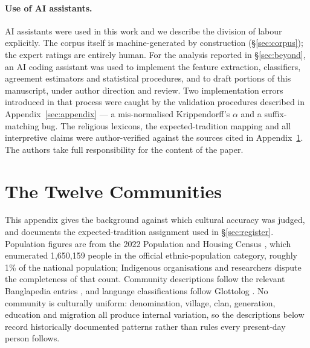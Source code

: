\documentclass[11pt]{article}
\begin{document}
\paragraph{Use of AI assistants.} AI assistants were used in this work
and we describe the division of labour explicitly. The corpus itself is
machine-generated by construction (\S\ref{sec:corpus}); the expert ratings are
entirely human. For the analysis reported in \S\ref{sec:beyond}, an AI coding
assistant was used to implement the feature extraction, classifiers, agreement
estimators and statistical procedures, and to draft portions of this
manuscript, under author direction and review. Two implementation errors
introduced in that process were caught by the validation procedures described
in Appendix~\ref{sec:appendix} --- a mis-normalised Krippendorff's $\alpha$ and
a suffix-matching bug. The
religious lexicons, the expected-tradition mapping and all interpretive claims
were author-verified against the sources cited in Appendix~\ref{sec:cultures}.
The authors take full responsibility for the content of the paper.



\appendix


\clearpage
\section{The Twelve Communities}
\label{sec:cultures}

This appendix gives the background against which cultural accuracy was judged,
and documents the expected-tradition assignment used in \S\ref{sec:register}.
Population figures are from the 2022 Population and Housing Census
\cite{bbs2022census}, which enumerated 1{,}650{,}159 people in the official
ethnic-population category, roughly 1\% of the national population; Indigenous
organisations and researchers dispute the completeness of that count.
Community descriptions follow the relevant Banglapedia entries
\cite{banglapedia}, and language classifications follow Glottolog
\cite{glottolog}. No community is culturally uniform: denomination, village,
clan, generation, education and migration all produce internal variation, so
the descriptions below record historically documented patterns rather than
rules every present-day person follows.
\end{document}
